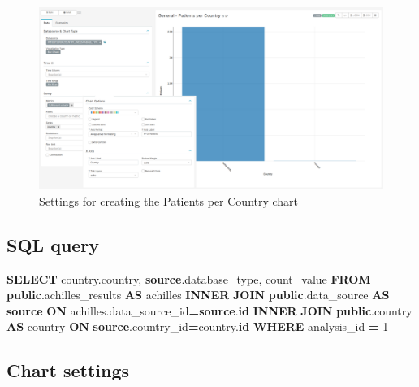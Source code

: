 \documentclass[
]{book}
\newenvironment{Shaded}{\begin{snugshade}}{\end{snugshade}}
\newcommand{\DecValTok}[1]{\textcolor[rgb]{0.00,0.00,0.81}{#1}}
\newcommand{\KeywordTok}[1]{\textcolor[rgb]{0.13,0.29,0.53}{\textbf{#1}}}
\newcommand{\NormalTok}[1]{#1}
\newcommand{\OperatorTok}[1]{\textcolor[rgb]{0.81,0.36,0.00}{\textbf{#1}}}
\begin{document}
\begin{figure}
\includegraphics[width=1\linewidth]{images/03-general/04-patients_per_country} \caption{Settings for creating the Patients per Country chart}\label{fig:patientsPerCountry}
\end{figure}

\hypertarget{sql-query-3}{%
\subsection{SQL query}\label{sql-query-3}}

\begin{Shaded}
\begin{Highlighting}[]
\KeywordTok{SELECT}\NormalTok{ country.country,}
       \KeywordTok{source}\NormalTok{.database\_type,}
\NormalTok{       count\_value}
\KeywordTok{FROM} \KeywordTok{public}\NormalTok{.achilles\_results }\KeywordTok{AS}\NormalTok{ achilles }
\KeywordTok{INNER} \KeywordTok{JOIN} \KeywordTok{public}\NormalTok{.data\_source }\KeywordTok{AS} \KeywordTok{source} \KeywordTok{ON}\NormalTok{ achilles.data\_source\_id}\OperatorTok{=}\KeywordTok{source}\NormalTok{.}\KeywordTok{id}
\KeywordTok{INNER} \KeywordTok{JOIN} \KeywordTok{public}\NormalTok{.country }\KeywordTok{AS}\NormalTok{ country }\KeywordTok{ON} \KeywordTok{source}\NormalTok{.country\_id}\OperatorTok{=}\NormalTok{country.}\KeywordTok{id}
\KeywordTok{WHERE}\NormalTok{ analysis\_id }\OperatorTok{=} \DecValTok{1}
\end{Highlighting}
\end{Shaded}

\hypertarget{chart-settings-3}{%
\subsection{Chart settings}\label{chart-settings-3}}
\end{document}
